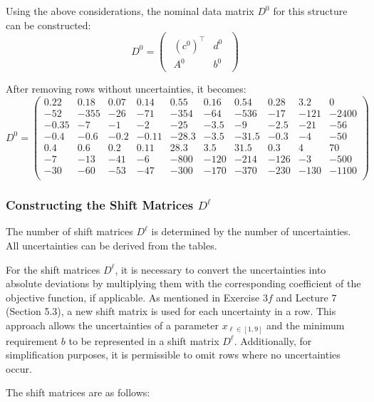 \documentclass[a4paper,12pt]{article}
\begin{document}
Using the above considerations, the nominal data matrix $D^0$ for this structure can be constructed:
\[
D^0 = \begin{pmatrix}\begin{array}{c|c}
(c^0)^\top & d^0 \\ \hline
A^0 & b^0
\end{array}\end{pmatrix}
\]

After removing rows without uncertainties, it becomes:
\[
D^0 = \begin{pmatrix}
0.22 & 0.18 & 0.07 & 0.14 & 0.55 & 0.16 & 0.54 & 0.28 & 3.2 & 0 \\
-52 & -355 & -26 & -71 & -354 & -64 & -536 & -17 & -121 & -2400 \\
-0.35 & -7 & -1 & -2 & -25 & -3.5 & -9 & -2.5 & -21 & -56 \\
-0.4 & -0.6 & -0.2 & -0.11 & -28.3 & -3.5 & -31.5 & -0.3 & -4 & -50 \\
0.4 & 0.6 & 0.2 & 0.11 & 28.3 & 3.5 & 31.5 & 0.3 & 4 & 70 \\
-7 & -13 & -41 & -6 & -800 & -120 & -214 & -126 & -3 & -500 \\
-30 & -60 & -53 & -47 & -300 & -170 & -370 & -230 & -130 & -1100 \\
\end{pmatrix}
\]

\subsubsection*{Constructing the Shift Matrices $D^\ell$}
The number of shift matrices $D^\ell$ is determined by the number of uncertainties. All uncertainties can be derived from the tables.

For the shift matrices $D^\ell$, it is necessary to convert the uncertainties into absolute deviations by multiplying them with the corresponding coefficient of the objective function, if applicable.
As mentioned in Exercise $3f$ and Lecture $7$ (Section 5.3), a new shift matrix is used for each uncertainty in a row.
This approach allows the uncertainties of a parameter $x_{\ell \in [1,9]}$ and the minimum requirement $b$ to be represented in a shift matrix $D^\ell$. Additionally, for simplification purposes, it is permissible to omit rows where no uncertainties occur.

The shift matrices are as follows:
\end{document}
